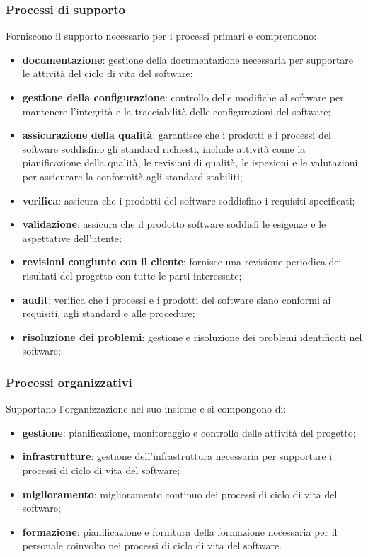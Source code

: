 \subsubsection{Processi di supporto}
Forniscono il supporto necessario per i processi primari e comprendono:
\begin{itemize}
    \item \textbf{documentazione}: gestione della documentazione necessaria per supportare le attività del ciclo di vita del software;
    \item \textbf{gestione della configurazione}: controllo delle modifiche al software per mantenere l'integrità e la tracciabilità delle configurazioni del software;
    \item \textbf{assicurazione della qualità}: garantisce che i prodotti e i processi del software soddisfino gli standard richiesti, include attività come la pianificazione della qualità, le revisioni di qualità, le ispezioni e le valutazioni per assicurare la conformità agli standard stabiliti;
    \item \textbf{verifica}: assicura che i prodotti del software soddisfino i requisiti specificati; 
    \item \textbf{validazione}: assicura che il prodotto software soddisfi le esigenze e le aspettative dell'utente;
    \item \textbf{revisioni congiunte con il cliente}: fornisce una revisione periodica dei risultati del progetto con tutte le parti interessate;
    \item \textbf{audit}: verifica che i processi e i prodotti del software siano conformi ai requisiti, agli standard e alle procedure;
    \item \textbf{risoluzione dei problemi}: gestione e risoluzione dei problemi identificati nel software;
\end{itemize}
\subsubsection{Processi organizzativi}
Supportano l'organizzazione nel suo insieme e si compongono di:
\begin{itemize}
    \item \textbf{gestione}: pianificazione, monitoraggio e controllo delle attività del progetto;
    \item \textbf{infrastrutture}: gestione dell'infrastruttura necessaria per supportare i processi di ciclo di vita del software;
    \item \textbf{miglioramento}: miglioramento continuo dei processi di ciclo di vita del software;
    \item \textbf{formazione}: pianificazione e fornitura della formazione necessaria per il personale coinvolto nei processi di ciclo di vita del software.
\end{itemize}